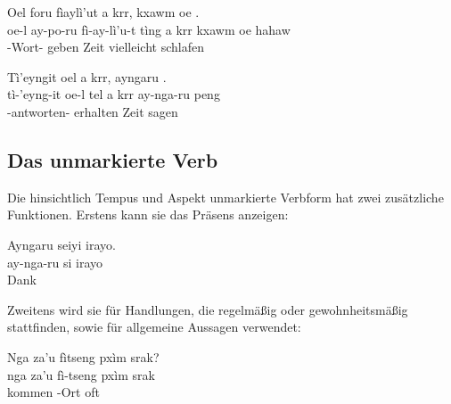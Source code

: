 \begin{interlin}
	\glll \Npawl{}Oel foru fìaylì'ut  a krr, kxawm oe . \\
	oe-l ay-po-ru fì-ay-lì'u-t tìng a krr kxawm oe hahaw \\
	  -Wort- geben  Zeit vielleicht  schlafen \\
\end{interlin}

\begin{interlin}
	\glll \Npawl{}Tì'eyngit oel  a krr, ayngaru . \\
	tì-'eyng-it oe-l tel a krr ay-nga-ru peng \\
	-antworten-  erhalten  Zeit  sagen \\
\end{interlin}

\subsection{Das unmarkierte Verb} Die hinsichtlich Tempus und Aspekt unmarkierte Verbform hat zwei zusätzliche Funktionen. Erstens kann sie das Präsens anzeigen:

\begin{interlin}
	\glll \Npawl{}Ayngaru seiyi irayo. \\
	ay-nga-ru si irayo \\
	  Dank \\
\end{interlin}

\noindent Zweitens wird sie für Handlungen, die regelmäßig oder gewohnheitsmäßig stattfinden, sowie für allgemeine Aussagen verwendet:

\begin{interlin}
	\glll \Npawl{}Nga za'u fìtseng pxìm srak? \\
	nga za'u fì-tseng pxìm srak \\
	 kommen -Ort oft  \\
\end{interlin}

